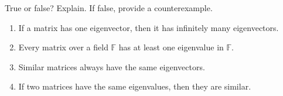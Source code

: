 \begin{exercise}
  \label{ex:hw06:eigenvalue-true-or-false}
  True or false? Explain. If false, provide a counterexample.
  \begin{enumerate}[{3}.1.][4]
    \item If a matrix has one eigenvector, then it has infinitely many
      eigenvectors.
    \item Every matrix over a field \(\mathbb F\) has at least one eigenvalue
      in \(\mathbb F\).
    \item Similar matrices always have the same eigenvectors.
    \item If two matrices have the same eigenvalues, then they are similar.
  \end{enumerate}
\end{exercise}
